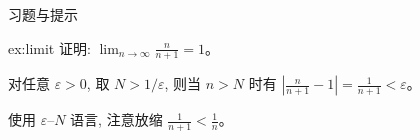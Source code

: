 
\begin{frame}{习题与提示}
  \begin{exercise}{}{ex:limit}
    证明: $\displaystyle\lim_{n \to \infty} \frac{n}{n+1} = 1$。
  \end{exercise}

  \pause

  \begin{solution}
    对任意 $\varepsilon > 0$, 取 $N > 1/\varepsilon$, 则当 $n > N$ 时有
    $\left|\frac{n}{n+1} - 1\right| = \frac{1}{n+1} < \varepsilon$。
  \end{solution}

  \begin{hint}[思路提示]
    使用 $\varepsilon$--$N$ 语言, 注意放缩 $\frac{1}{n+1} < \frac{1}{n}$。
  \end{hint}
\end{frame}
